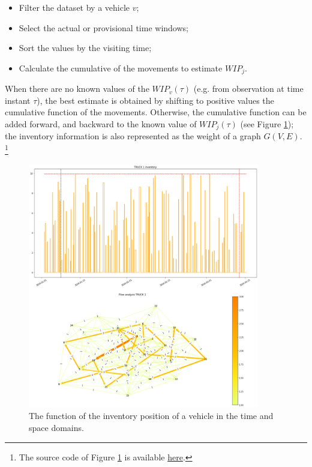 \begin{itemize}
    \item Filter the dataset by a vehicle $v$;
	\item Select the actual or provisional time windows;
	\item Sort the values by the visiting time;
	\item Calculate the cumulative of the movements to estimate $WIP_j$.

\end{itemize}

When there are no known values of the $WIP_v(\tau)$ (e.g. from observation at time instant $\tau$), the best estimate is obtained by shifting to positive values the cumulative function of the movements. Otherwise, the cumulative function can be added forward, and backward to the known value of $WIP_j(\tau)$ (see Figure \ref{fig_vehicleInventory}); the inventory information is also represented as the weight of a graph $G(V,E)$. \footnote{The source code of Figure \ref{fig_vehicleInventory} is available \href{https://github.com/aletuf93/logproj/blob/master/examples/DIST_01\%20Supply\%20Chain\%20Assessment.ipynb}{here}.}

\begin{figure}[hbt!]
\centering
\includegraphics[width=0.9\textwidth]{SectionDistribution/control_figures/fig_vehicleInventory.png}
\captionsetup{type=figure}
\caption{The function of the inventory position of a vehicle in the time and space domains.}
\label{fig_vehicleInventory}
\end{figure}


